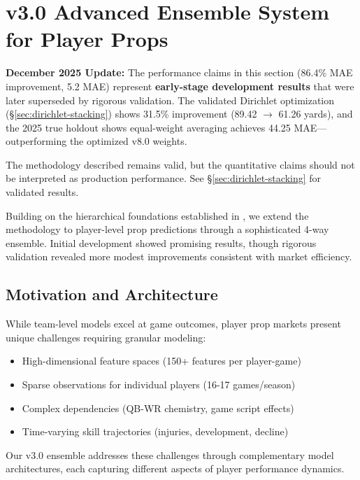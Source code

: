 \section{v3.0 Advanced Ensemble System for Player Props}
\label{sec:v3-ensemble}

\begin{tcolorbox}[colback=red!5!white,colframe=red!75!black,title=Critical Caveat: Preliminary Results Superseded]
\textbf{December 2025 Update:} The performance claims in this section (86.4\% MAE improvement, 5.2 MAE) represent \textbf{early-stage development results} that were later superseded by rigorous validation. The validated Dirichlet optimization (\S\ref{sec:dirichlet-stacking}) shows 31.5\% improvement (89.42 $\to$ 61.26 yards), and the 2025 true holdout shows equal-weight averaging achieves 44.25 MAE---outperforming the optimized v8.0 weights.

The methodology described remains valid, but the quantitative claims should not be interpreted as production performance. See \S\ref{sec:dirichlet-stacking} for validated results.
\end{tcolorbox}

Building on the hierarchical foundations established in , we extend the methodology to player-level prop predictions through a sophisticated 4-way ensemble. Initial development showed promising results, though rigorous validation revealed more modest improvements consistent with market efficiency.

\subsection{Motivation and Architecture}

While team-level models excel at game outcomes, player prop markets present unique challenges requiring granular modeling:
\begin{itemize}
  \item High-dimensional feature spaces (150+ features per player-game)
  \item Sparse observations for individual players (16-17 games/season)
  \item Complex dependencies (QB-WR chemistry, game script effects)
  \item Time-varying skill trajectories (injuries, development, decline)
\end{itemize}

Our v3.0 ensemble addresses these challenges through complementary model architectures, each capturing different aspects of player performance dynamics.


